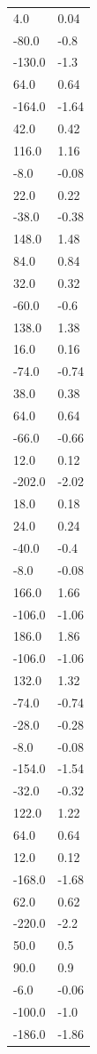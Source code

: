 \begin{longtable}{ll}
4.0 & 0.04 \\
-80.0 & -0.8 \\
-130.0 & -1.3 \\
64.0 & 0.64 \\
-164.0 & -1.64 \\
42.0 & 0.42 \\
116.0 & 1.16 \\
-8.0 & -0.08 \\
22.0 & 0.22 \\
-38.0 & -0.38 \\
148.0 & 1.48 \\
84.0 & 0.84 \\
32.0 & 0.32 \\
-60.0 & -0.6 \\
138.0 & 1.38 \\
16.0 & 0.16 \\
-74.0 & -0.74 \\
38.0 & 0.38 \\
64.0 & 0.64 \\
-66.0 & -0.66 \\
12.0 & 0.12 \\
-202.0 & -2.02 \\
18.0 & 0.18 \\
24.0 & 0.24 \\
-40.0 & -0.4 \\
-8.0 & -0.08 \\
166.0 & 1.66 \\
-106.0 & -1.06 \\
186.0 & 1.86 \\
-106.0 & -1.06 \\
132.0 & 1.32 \\
-74.0 & -0.74 \\
-28.0 & -0.28 \\
-8.0 & -0.08 \\
-154.0 & -1.54 \\
-32.0 & -0.32 \\
122.0 & 1.22 \\
64.0 & 0.64 \\
12.0 & 0.12 \\
-168.0 & -1.68 \\
62.0 & 0.62 \\
-220.0 & -2.2 \\
50.0 & 0.5 \\
90.0 & 0.9 \\
-6.0 & -0.06 \\
-100.0 & -1.0 \\
-186.0 & -1.86 \\

\end{longtable}

